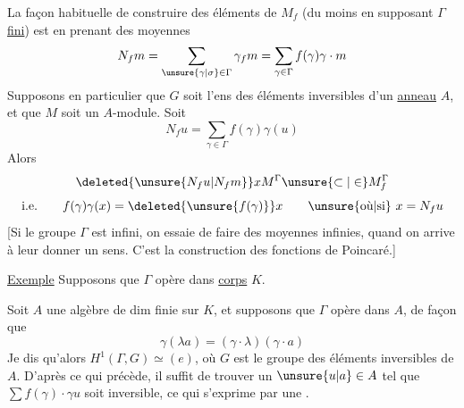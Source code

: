  La façon habituelle de construire des éléments de $M_f$ (du moins en supposant $\Gamma$ \uline{fini}) est  en prenant des moyennes
\[
N_f m=\sum_{\unsure{\gamma|\sigma}\in\Gamma}\gamma_f m=\sum_{\gamma\in\Gamma}f(\gamma)\gamma\cdot m
\]
Supposons en particulier que $G$ soit l'ens des éléments inversibles d'un \uline{anneau} $A$, et que $M$ soit un $A$-module. Soit  
\[
N_f u=\sum_{\gamma\in\Gamma}f(\gamma)\gamma(u)
\]
Alors
\[
\deleted{\unsure{N_f u|N_f m}}xM^\Gamma\unsure{\subset|\in}M_f^\Gamma
\]
\[
\text{i.e.}\qquad f(\gamma)\gamma(x)=\deleted{\unsure{f(\gamma)}}x\qquad\text{\unsure{où|si} }x=N_f u
\]
[Si le groupe $\Gamma$ est infini, on essaie de faire des moyennes infinies, quand on arrive à leur donner un sens. C'est la  construction des fonctions  de Poincaré.]


\uline{Exemple} Supposons que $\Gamma$ \uline{} opère  dans  \uline{corps} $K$.

Soit $A$ une algèbre de dim finie sur $K$, et supposons que $\Gamma$ opère dans $A$, de façon que
\[
\gamma(\lambda a)=(\gamma\cdot\lambda)(\gamma\cdot a)
\]
Je dis qu'alors $H^1(\Gamma,G)\simeq(e)$, où $G$ est le groupe des éléments inversibles de $A$. D'après ce qui précède, il suffit de trouver un $\unsure{u|a}\in A$ tel que $\sum f(\gamma)\cdot\gamma u$ soit inversible, ce qui s'exprime par une .
